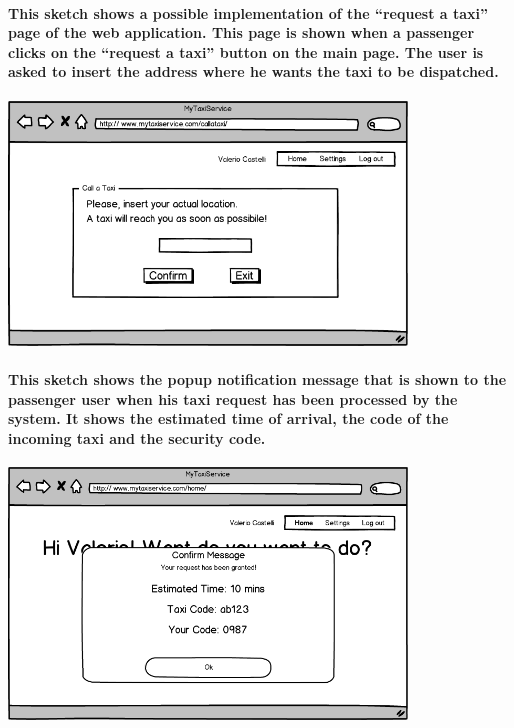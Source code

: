 \begin{center}
\paragraph{This sketch shows a possible implementation of the “request a taxi” page of the web application. This page is shown when a passenger clicks on the “request a taxi” button on the main page. The user is asked to insert the address where he wants the taxi to be dispatched.}
\includegraphics[width=300pt,keepaspectratio]{images/user_call.png}
\paragraph{This sketch shows the popup notification message that is shown to the passenger user when his taxi request has been processed by the system. It shows the estimated time of arrival, the code of the incoming taxi and the security code.}
\includegraphics[width=300pt,keepaspectratio]{images/user_confirm.png}

\end{center}
